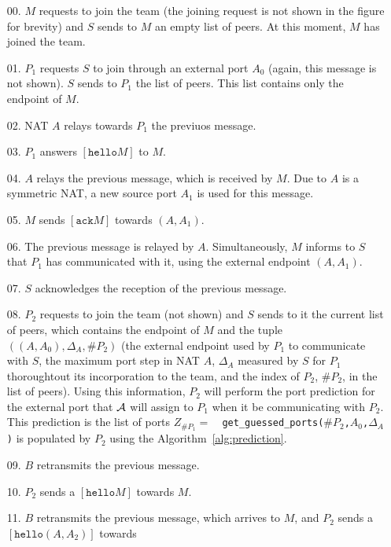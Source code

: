 \begin{itemize}
  \item [00.] $M$ requests to join the team (the joining request is
    not shown in the figure for brevity) and $S$ sends to $M$ an empty
    list of peers. At this moment, $M$ has joined the team.
  \item [01.] $P_1$ requests $S$ to join through an external port
    $A_0$ (again, this message is not shown).  $S$ sends to $P_1$ the
    list of peers. This list contains only the endpoint of $M$.
  \item [02.] NAT $A$ relays towards $P_1$ the previuos message.
  \item [03.] $P_1$ answers $[\mathtt{hello} M]$ to $M$.
  \item [04.] $A$ relays the previous message, which is received by
    $M$. Due to $A$ is a symmetric NAT, a new source port $A_1$ is
    used for this message.
  \item [05.] $M$ sends $[\mathtt{ack} M]$ towards $(A, A_1)$.
  \item [06.] The previous message is relayed by $A$. Simultaneously,
    $M$ informs to $S$ that $P_1$ has communicated
    with it, using the external endpoint $(A,A_1)$.
  \item [07.] $S$ acknowledges the reception of the
    previous message.
  \item [08.] $P_2$ requests to join the team (not shown) and $S$
    sends to it the current list of peers, which contains the endpoint
    of $M$ and the tuple $((A,A_0),\Delta_{A},\#P_2)$ (the external
    endpoint used by $P_1$ to communicate with $S$, the maximum port
    step in NAT $A$, $\Delta_{A}$ measured by $S$ for $P_1$
    thoroughtout its incorporation to the team, and the index of
    $P_2$, $\#P_2$, in the list of peers). Using this information,
    $P_2$ will perform the port prediction for the external port that
    $\cal{A}$ will assign to $P_1$ when it be communicating with
    $P_2$. This prediction is the list of ports
    $Z_{\#P_1}=${~\tt{\footnotesize
        get\_guessed\_ports}($\#P_2${\footnotesize,}$A_0${\footnotesize,}$\Delta_A$)}
    is populated by $P_2$ using the Algorithm~\ref{alg:prediction}.
  \item [09.] $B$ retransmits the previous message.
  \item [10.] $P_2$ sends a $[\mathtt{hello} M]$ towards $M$.
  \item [11.] $B$ retransmits the previous message, which
    arrives to $M$, and $P_2$ sends a
    $[\mathtt{hello} (A,A_2)]$ towards

\end{itemize}
